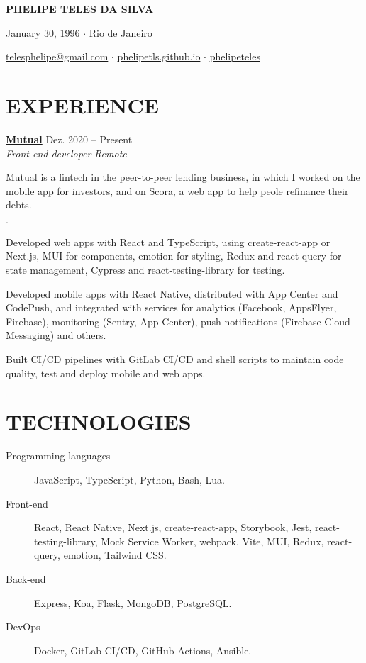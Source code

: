 \documentclass[12pt]{article}
\newenvironment{tightlist}
  {\begin{list}
    {$\cdot$}
    {
      \setlength{\leftmargin}{0em}
      \setlength{\itemsep}{\smallskipamount}
    }
  }
{\end{list}}
\begin{document}
\pagestyle{empty}

\centerline{\huge\bf PHELIPE TELES DA SILVA}
\medskip

\centerline{January 30, 1996 $\cdot$ Rio de Janeiro}
\smallskip

\centerline{
  \href{mailto:telesphelipe@gmail.com}{ telesphelipe@gmail.com}
  $\cdot$
  \href{https://phelipetls.github.io}{ phelipetls.github.io}
  $\cdot$
  \href{https://linkedin.com/in/phelipeteles}{ phelipeteles}
}
\smallskip

\section*{EXPERIENCE}

\textbf{\href{https://mutual.club}{Mutual}} \hfill Dez. 2020 -- Present \\
\textit{Front-end developer} \hfill \textit{Remote} {\parfillskip=0pt\par}

Mutual is a fintech in the peer-to-peer lending business, in which I worked on
the \href{https://mutual.club/en/invest.html}{mobile app for investors}, and on
\href{https://scora.com.br/}{Scora}, a web app to help peole refinance their
debts.

\begin{tightlist}
  \item Developed web apps with React and TypeScript, using create-react-app or
    Next.js, MUI for components, emotion for styling, Redux and react-query for
    state management, Cypress and react-testing-library for testing.
  \item Developed mobile apps with React Native, distributed with App
    Center and CodePush, and integrated with services for analytics (Facebook,
    AppsFlyer, Firebase), monitoring (Sentry, App Center), push notifications
    (Firebase Cloud Messaging) and others.
  \item Built CI/CD pipelines with GitLab CI/CD and shell scripts to maintain
    code quality, test and deploy mobile and web apps.
\end{tightlist}

\section*{TECHNOLOGIES}

\begin{description}
  \item[Programming languages] JavaScript, TypeScript, Python, Bash, Lua.
  \item[Front-end] React, React Native, Next.js, create-react-app, Storybook,
    Jest, react-testing-library, Mock Service Worker, webpack, Vite, MUI, Redux,
    react-query, emotion, Tailwind CSS.
  \item[Back-end] Express, Koa, Flask, MongoDB, PostgreSQL.
  \item[DevOps] Docker, GitLab CI/CD, GitHub Actions, Ansible.
\end{description}
\end{document}
